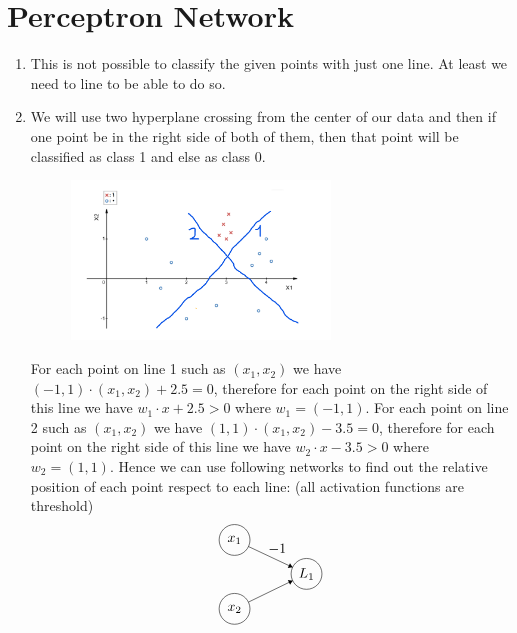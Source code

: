 \documentclass[12]{article}
\begin{document}
	\pagebreak
	\section{Perceptron Network}
	\begin{enumerate}[label=\textbf{(\alph*)}]
		\item
		This is not possible to classify the given points with just one line. At least we need to line to be able to do so.
		\item
		We will use two hyperplane crossing from the center of our data and then if one point be in the right side of both of them, then that point will be classified as class 1 and else as class 0.
		\begin{figure}[H]
			\centering
			\includegraphics[width=0.65\textwidth]{q3.png}
		\end{figure}
		For each point on line 1 such as $(x_1, x_2)$ we have $(-1,1)\cdot(x_1, x_2) + 2.5 = 0$, therefore for each point on the right side of this line we have $w_1\cdot x + 2.5 > 0$ where $w_1 = (-1, 1)$. For each point on line 2 such as $(x_1, x_2)$ we have $(1,1)\cdot(x_1, x_2) - 3.5 = 0$, therefore for each point on the right side of this line we have $w_2\cdot x - 3.5 > 0$ where $w_2 = (1,1)$. Hence we can use following networks to find out the relative position of each point respect to each line: (all activation functions are threshold)
		\vspace*{1.5em}
		\[
		\begin{tikzpicture}[scale=0.13]
			\tikzstyle{every node}+=[inner sep=0pt]
			\draw [black] (22.6,-25.3) circle (3);
			\draw (22.6,-25.3) node {$x_1$};
			\draw [black] (22.6,-38.7) circle (3);
			\draw (22.6,-38.7) node {$x_2$};
			\draw [black] (36.6,-31.9) circle (3);
			\draw (36.6,-31.9) node {$L_1$};
			\draw [black] (25.31,-26.58) -- (33.89,-30.62);
			\fill [black] (33.89,-30.62) -- (33.38,-29.83) -- (32.95,-30.73);
			\draw (30.91,-28.09) node [above] {$-1$};
			\draw [black] (25.3,-37.39) -- (33.9,-33.21);
			\fill [black] (33.9,-33.21) -- (32.96,-33.11) -- (33.4,-34.01);

\end{tikzpicture}\]
\end{enumerate}
\end{document}
